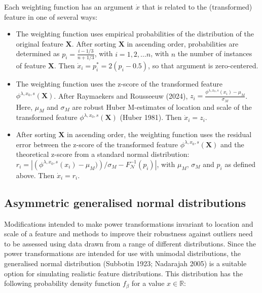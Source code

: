 \documentclass[preprint,12pt,authoryear]{elsarticle}
\begin{document}
Each weighting function has an argument \(\dot{x}\) that is related to
the (transformed) feature in one of several ways:

\begin{itemize}
\item
  The weighting function uses empirical probabilities of the
  distribution of the original feature \(\mathbf{X}\). After sorting
  \(\mathbf{X}\) in ascending order, probabilities are determined as
  \(p_i = \frac{i - 1/3}{n + 1/3}\), with \(i = 1, 2, \ldots n\), with
  \(n\) the number of instances of feature \(\mathbf{X}\). Then
  \(\dot{x}_i = p^{*}_i=2 \left( p_i - 0.5\right)\), so that argument is
  zero-centered.
\item
  The weighting function uses the z-score of the transformed feature
  \(\phi^{\lambda, x_0, s} (\mathbf{X})\). After Raymaekers and
  Rousseeuw (2024),
  \(z_i = \frac{\phi^{\lambda, x_0, s}(x_i) - \mu_M}{\sigma_M}\). Here,
  \(\mu_M\) and \(\sigma_M\) are robust Huber M-estimates of location
  and scale of the transformed feature
  \(\phi^{\lambda, x_0, s} (\mathbf{X})\) (Huber 1981). Then
  \(\dot{x}_i = z_i\).
\item
  After sorting \(\mathbf{X}\) in ascending order, the weighting
  function uses the residual error between the z-score of the
  transformed feature \(\phi^{\lambda, x_0, s} (\mathbf{X})\) and the
  theoretical z-score from a standard normal distribution:
  \(r_i =\left| \left( \phi^{\lambda, x_0, s}(x_i) - \mu_M)\right) / \sigma_M - F^{-1}_{\mathcal{N}}(p_i) \right|\),
  with \(\mu_M\), \(\sigma_M\) and \(p_i\) as defined above. Then
  \(\dot{x}_i = r_i\).
\end{itemize}

\subsection{Asymmetric generalised normal
distributions}\label{asymmetric-generalised-normal-distributions}

Modifications intended to make power transformations invariant to
location and scale of a feature and methods to improve their robustness
against outliers need to be assessed using data drawn from a range of
different distributions. Since the power transformations are intended
for use with unimodal distributions, the generalised normal distribution
(Subbotin 1923; Nadarajah 2005) is a suitable option for simulating
realistic feature distributions. This distribution has the following
probability density function \(f_{\beta}\) for a value
\(x \in \mathbb{R}\):
\end{document}
